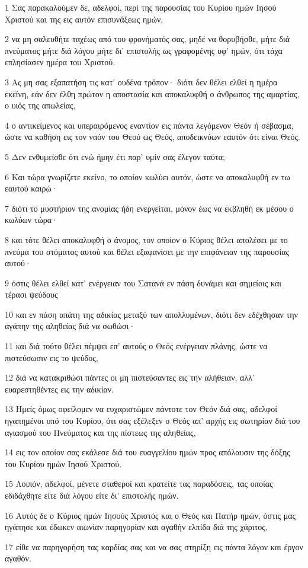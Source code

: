 \par 1 Σας παρακαλούμεν δε, αδελφοί, περί της παρουσίας του Κυρίου ημών Ιησού Χριστού και της εις αυτόν επισυνάξεως ημών,
\par 2 να μη σαλευθήτε ταχέως από του φρονήματός σας, μηδέ να θορυβήσθε, μήτε διά πνεύματος μήτε διά λόγου μήτε δι' επιστολής ως γραφομένης υφ' ημών, ότι τάχα επλησίασεν ημέρα του Χριστού.
\par 3 Ας μη σας εξαπατήση τις κατ' ουδένα τρόπον· διότι δεν θέλει ελθεί η ημέρα εκείνη, εάν δεν έλθη πρώτον η αποστασία και αποκαλυφθή ο άνθρωπος της αμαρτίας, ο υιός της απωλείας,
\par 4 ο αντικείμενος και υπεραιρόμενος εναντίον εις πάντα λεγόμενον Θεόν ή σέβασμα, ώστε να καθήση εις τον ναόν του Θεού ως Θεός, αποδεικνύων εαυτόν ότι είναι Θεός.
\par 5 Δεν ενθυμείσθε ότι ενώ ήμην έτι παρ' υμίν σας έλεγον ταύτα;
\par 6 Και τώρα γνωρίζετε εκείνο, το οποίον κωλύει αυτόν, ώστε να αποκαλυφθή εν τω εαυτού καιρώ·
\par 7 διότι το μυστήριον της ανομίας ήδη ενεργείται, μόνον έως να εκβληθή εκ μέσου ο κωλύων τώρα·
\par 8 και τότε θέλει αποκαλυφθή ο άνομος, τον οποίον ο Κύριος θέλει απολέσει με το πνεύμα του στόματος αυτού και θέλει εξαφανίσει με την επιφάνειαν της παρουσίας αυτού·
\par 9 όστις θέλει ελθεί κατ' ενέργειαν του Σατανά εν πάση δυνάμει και σημείοις και τέρασι ψεύδους
\par 10 και εν πάση απάτη της αδικίας μεταξύ των απολλυμένων, διότι δεν εδέχθησαν την αγάπην της αληθείας διά να σωθώσι·
\par 11 και διά τούτο θέλει πέμψει επ' αυτούς ο Θεός ενέργειαν πλάνης, ώστε να πιστεύσωσιν εις το ψεύδος,
\par 12 διά να κατακριθώσι πάντες οι μη πιστεύσαντες εις την αλήθειαν, αλλ' ευαρεστηθέντες εις την αδικίαν.
\par 13 Ημείς όμως οφείλομεν να ευχαριστώμεν πάντοτε τον Θεόν διά σας, αδελφοί ηγαπημένοι υπό του Κυρίου, ότι σας εξέλεξεν ο Θεός απ' αρχής εις σωτηρίαν διά του αγιασμού του Πνεύματος και της πίστεως της αληθείας,
\par 14 εις τον οποίον σας εκάλεσε διά του ευαγγελίου ημών προς απόλαυσιν της δόξης του Κυρίου ημών Ιησού Χριστού.
\par 15 Λοιπόν, αδελφοί, μένετε σταθεροί και κρατείτε τας παραδόσεις, τας οποίας εδιδάχθητε είτε διά λόγου είτε δι' επιστολής ημών.
\par 16 Αυτός δε ο Κύριος ημών Ιησούς Χριστός και ο Θεός και Πατήρ ημών, όστις μας ηγάπησε και έδωκεν αιωνίαν παρηγορίαν και αγαθήν ελπίδα διά της χάριτος,
\par 17 είθε να παρηγορήση τας καρδίας σας και να σας στηρίξη εις πάντα λόγον και έργον αγαθόν.

